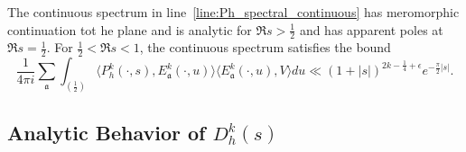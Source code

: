 \begin{proposition}\label{prop:hyperboloid_continuous_props}
  The continuous spectrum in line~\eqref{line:Ph_spectral_continuous} has meromorphic
  continuation tot he plane and is analytic for $\Re s > \frac{1}{2}$ and has apparent
  poles at $\Re s = \frac{1}{2}$.
  For $\frac{1}{2} < \Re s < 1$, the continuous spectrum satisfies the bound
  \begin{equation}
    \frac{1}{4\pi i} \sum_{\mathfrak{a}} \int_{(\frac{1}{2})} \langle P_h^k(\cdot, s),
    E^k_{\mathfrak{a}}(\cdot, u) \rangle \langle E^k_{\mathfrak{a}}(\cdot, u), V \rangle
    du \ll (1 + \lvert s \rvert)^{2k - \frac{1}{4} + \epsilon} e^{-\frac{\pi}{2}\lvert s
    \rvert}.
  \end{equation}
\end{proposition}



\subsection{Analytic Behavior of $D_h^k(s)$}


